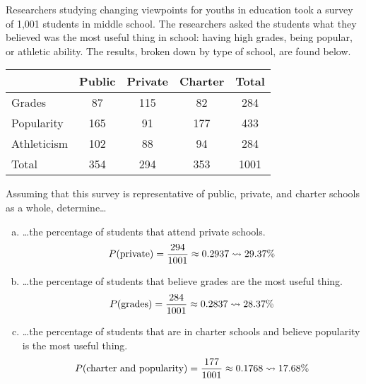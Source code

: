 \documentclass[12pt,letterpaper]{exam}
\begin{document}
\examtitle
{} 
\scores
\bottomline
\newpage

\begin{questions}

\newpage
\question[10] Researchers studying changing viewpoints for youths in education took a survey of 1,001 students in middle school. The researchers asked the students what they believed was the most useful thing in school: having high grades, being popular, or athletic ability. The results, broken down by type of school, are found below. \par
	\begin{table}[!ht]
	\centering
	\begin{tabular}{| l || c | c | c || c |} \hline 
	& Public & Private & Charter & Total \\ \hline \hline
	Grades & 87 & 115 & 82 & 284 \\ \hline
	Popularity & 165 & 91 & 177 & 433 \\ \hline
	Athleticism & 102 & 88 & 94 & 284 \\ \hline \hline
	Total & 354 & 294 & 353 & 1001 \\ \hline
	\end{tabular}
	\end{table} \par
Assuming that this survey is representative of public, private, and charter schools as a whole, determine\dots

\begin{enumerate}[(a)]
\item \dots the percentage of students that attend private schools. \pvspace{0.3cm}
	\[
	P(\text{private})= \dfrac{294}{1001} \approx 0.2937 \rightsquigarrow 29.37\%
	\] \pvspace{0.3cm}

\item \dots the percentage of students that believe grades are the most useful thing. \pvspace{0.3cm}
	\[
	P(\text{grades})= \dfrac{284}{1001} \approx 0.2837 \rightsquigarrow 28.37\%
	\] \pvspace{0.3cm}

\item \dots the percentage of students that are in charter schools and believe popularity is the most useful thing. \pvspace{0.3cm}
	\[
	P(\text{charter and popularity})= \dfrac{177}{1001} \approx 0.1768 \rightsquigarrow 17.68\%
	\] \pvspace{0.3cm}


\end{enumerate}
\end{questions}
\end{document}
